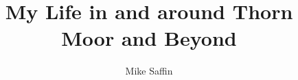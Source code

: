 \documentclass[oneside,11pt,b5paper]{memoir}
\title{My Life in and around Thorn Moor and Beyond}
\author{Mike Saffin}
\date{}
\begin{document}
\maketitle

\chapter{}

\end{document}
